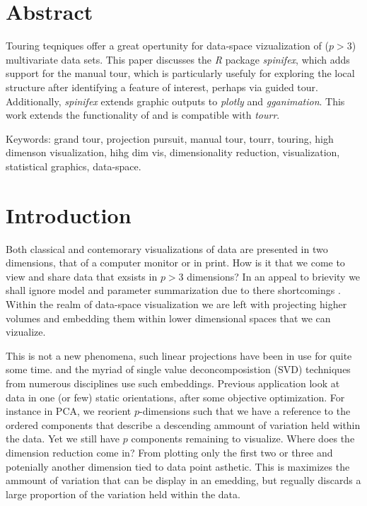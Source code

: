 \documentclass{monashthesis}
\begin{document}
\section{Abstract}\label{abstract-1}

Touring teqniques offer a great opertunity for data-space vizualization
of (\(p > 3\)) multivariate data sets. This paper discusses the \emph{R}
package \emph{spinifex}, which adds support for the manual tour, which
is particularly usefuly for exploring the local structure after
identifying a feature of interest, perhaps via guided tour.
Additionally, \emph{spinifex} extends graphic outputs to \emph{plotly}
and \emph{gganimation}. This work extends the functionality of and is
compatible with \emph{tourr}.

Keywords: grand tour, projection pursuit, manual tour, tourr, touring,
high dimenson visualization, hihg dim vis, dimensionality reduction,
visualization, statistical graphics, data-space.

\section{Introduction}\label{introduction}

Both classical and contemorary visualizations of data are presented in
two dimensions, that of a computer monitor or in print. How is it that
we come to view and share data that exsists in \(p > 3\) dimensions? In
an appeal to brievity we shall ignore model and parameter summarization
due to there shortcomings
\autocites{anscombe_graphs_1973}{matejka_same_2017}. Within the realm of
data-space visualization we are left with projecting higher volumes and
embedding them within lower dimensional spaces that we can vizualize.

This is not a new phenomena, such linear projections have been in use
for quite some time. \autocites{pearson_liii._1901}{fisher_use_1936} and
the myriad of single value deconcomposistion (SVD) techniques from
numerous disciplines use such embeddings. Previous application look at
data in one (or few) static orientations, after some objective
optimization. For instance in PCA, we reorient \(p\)-dimensions such
that we have a reference to the ordered components that describe a
descending ammount of variation held within the data. Yet we still have
\(p\) components remaining to visualize. Where does the dimension
reduction come in? From plotting only the first two or three and
potenially another dimension tied to data point asthetic. This is
maximizes the ammount of variation that can be display in an emedding,
but regually discards a large proportion of the variation held within
the data.
\end{document}
